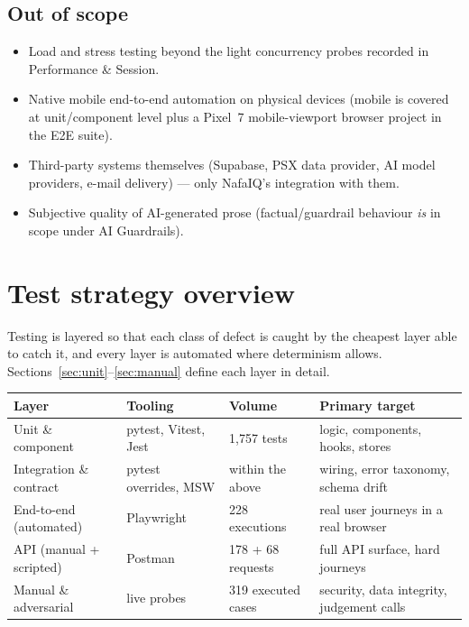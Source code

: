 \documentclass[11pt,a4paper]{article}
\begin{document}
\subsection{Out of scope}
\begin{itemize}
  \item Load and stress testing beyond the light concurrency probes recorded in
        Performance \& Session.
  \item Native mobile end-to-end automation on physical devices (mobile is
        covered at unit/component level plus a Pixel~7 mobile-viewport browser
        project in the E2E suite).
  \item Third-party systems themselves (Supabase, PSX data provider, AI model
        providers, e-mail delivery) --- only NafaIQ's integration with them.
  \item Subjective quality of AI-generated prose (factual/guardrail behaviour
        \emph{is} in scope under AI Guardrails).
\end{itemize}

\section{Test strategy overview}

Testing is layered so that each class of defect is caught by the cheapest layer
able to catch it, and every layer is automated where determinism allows.
Sections~\ref{sec:unit}--\ref{sec:manual} define each layer in detail.

\begin{center}
\small
\begin{tabularx}{\textwidth}{lllL}
\toprule
\textbf{Layer} & \textbf{Tooling} & \textbf{Volume} & \textbf{Primary target} \\
\midrule
Unit \& component & pytest, Vitest, Jest & 1{,}757 tests & logic, components, hooks, stores \\
Integration \& contract & pytest overrides, MSW & within the above & wiring, error taxonomy, schema drift \\
End-to-end (automated) & Playwright & 228 executions & real user journeys in a real browser \\
API (manual + scripted) & Postman & 178 + 68 requests & full API surface, hard journeys \\
Manual \& adversarial & live probes & 319 executed cases & security, data integrity, judgement calls \\
\bottomrule
\end{tabularx}
\end{center}
\end{document}
